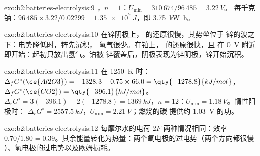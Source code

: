 \begin{solution}{exo:b2:batteries-electrolysis:9}
，$n = 1$：$U_{\min} = 310\,674/96\,485 = \qty{3.22}{V}$。
每千克钠：$96\,485 \times 3.22/0.02299 = \qty{1.35e7}{J}$，即
\qty{3.75}{kW.h}。
\end{solution}

\begin{solution}{exo:b2:batteries-electrolysis:10}
在锌阴极上， 的还原很慢，其势垒位于
锌的波之下：电势降低时，锌先沉积，
氢气很少。在铂上， 的还原很快，且
在 \qty{0}{V} 附近即开始：起初只放出氢气。铂被
锌覆盖后，阴极表现为锌阴极，锌开始沉积。
\end{solution}

\begin{solution}{exo:b2:batteries-electrolysis:11}
在 \qty{1250}{K} 时：$\Delta_f G^\circ(\ce{Al2O3}) = -1328.3 + 0.75 \times 66.0 =
\qty{-1278.8}{kJ/mol}$，$\Delta_f G^\circ(\ce{CO2}) = \qty{-396.1}{kJ/mol}$。$\Delta_r G^\circ =
3(-396.1) - 2(-1278.8) = \qty{1369}{kJ}$，$n = 12$：$U_{\min} = \qty{1.18}{V}$。惰性阳极时：
$\Delta_r G^\circ = \qty{2557.5}{kJ}$，$U_{\min} = \qty{2.21}{V}$；燃烧的碳
提供约 \qty{1.03}{V} 的功。
\end{solution}

\begin{solution}{exo:b2:batteries-electrolysis:12}
每摩尔水的电荷 $2F$ 两种情况相同：效率 $0.70/1.80 =
0.39$。其余能量转化为热量：两个氧电极的过电势（两个方向都很慢
）、氢电极的过电势以及欧姆损耗。
\end{solution}

